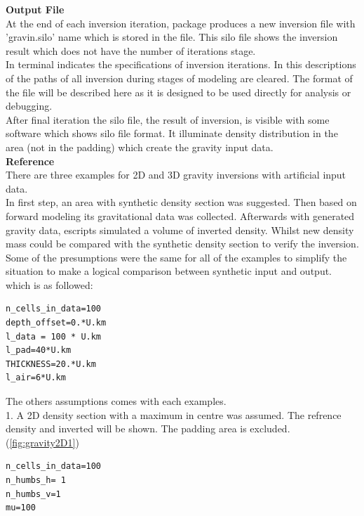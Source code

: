 \textbf{Output File}\\

At the end of each inversion iteration, package produces a new inversion file with 'gravin.silo' name which is stored in the file. This silo file shows the inversion result which does not have the number of iterations stage.\\
 In terminal indicates the specifications of inversion iterations. In this descriptions of the paths of all inversion during stages of modeling are cleared. The format of the file will be described here as it is designed to be used directly for analysis or debugging.\\
After final iteration the silo file, the result of inversion, is visible with some software which shows silo file format. It illuminate density distribution in the area (not in the padding) which create the gravity input data.\\

\textbf{Reference}\\

There are three examples for 2D and 3D gravity inversions with artificial input data.\\
In first step, an area with synthetic density section was suggested. Then based on forward modeling its gravitational data was collected. Afterwards with generated gravity data, escripts simulated a volume of inverted density. Whilst new density mass could be compared with the synthetic density section to verify the inversion.\\

Some of the presumptions were the same for all of the examples to simplify the situation to make a logical comparison between synthetic input and output. which is as followed:\\
\begin{verbatim}
n_cells_in_data=100
depth_offset=0.*U.km
l_data = 100 * U.km
l_pad=40*U.km
THICKNESS=20.*U.km
l_air=6*U.km
\end{verbatim}
The others assumptions comes with each examples.\\

1.  A 2D density section with a maximum in centre was assumed. The refrence density and inverted will be shown. The padding area is excluded. (\ref{fig:gravity2D1})\\
\begin{verbatim}
n_cells_in_data=100
n_humbs_h= 1
n_humbs_v=1
mu=100
\end{verbatim}

